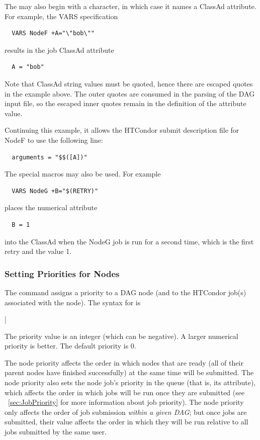 The  may also begin with a \Expr{+} character, in which case it
names a ClassAd attribute. For example, the VARS specification
\begin{verbatim}
  VARS NodeF +A="\"bob\""
\end{verbatim}
results in the job ClassAd attribute
\begin{verbatim}
  A = "bob"
\end{verbatim}
Note that ClassAd string values must be quoted, hence there are escaped
quotes in the example above.  The outer quotes are consumed in the parsing of
the DAG input file, so the escaped inner quotes remain in the definition
of the attribute value.

Continuing this example,
it allows the HTCondor submit description file for NodeF to use
the following line:
\begin{verbatim}
  arguments = "$$([A])"
\end{verbatim}

The special macros may also be used.
For example
\begin{verbatim}
  VARS NodeG +B="$(RETRY)"
\end{verbatim}
places the numerical attribute
\begin{verbatim}
  B = 1
\end{verbatim}
into the ClassAd when the NodeG job is run for a second time,
which is the first retry and the value 1. 

\subsubsection{\label{sec:DAG-SetNodePriority}Setting Priorities for Nodes}

The  command assigns a priority to a DAG node
(and to the HTCondor job(s) associated with the node).
The syntax for  is

 | 

The priority value is an integer (which can be negative).  A larger
numerical priority is better.  The default priority is 0.

The node priority affects the order in which nodes that are ready
(all of their parent nodes have finished successfully)
at the same time will be submitted.  The node priority also sets
the node job's priority in the queue (that is, its 
attribute), which affects the order in which jobs will be run once
they are submitted (see ~\ref{sec:JobPriority} for more information
about job priority).
The node priority only affects the order of job submission
\emph{within a given DAG}; but once jobs are submitted, their
 value affects the order in which they will be run
relative to all jobs submitted by the same user.

